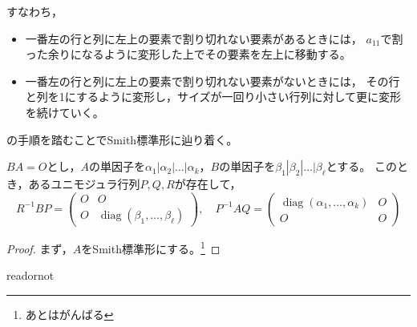 \documentclass[uplatex]{jsarticle}
\DeclareMathOperator{\diag}{diag}
\begin{document}
すなわち，
\begin{itemize}
  \item 一番左の行と列に左上の要素で割り切れない要素があるときには，
  $a_{11}$で割った余りになるように変形した上でその要素を左上に移動する。
  \item 一番左の行と列に左上の要素で割り切れない要素がないときには，
  その行と列を1にするように変形し，サイズが一回り小さい行列に対して更に変形を続けていく。
\end{itemize}
の手順を踏むことでSmith標準形に辿り着く。

\begin{hodai}
  $BA = O$とし，$A$の単因子を$\alpha_{1} | \alpha_{2} | \dots | \alpha_{k}$，$B$の単因子を$\beta_{1} | \beta_{2} | \dots | \beta_{\ell}$とする。
  このとき，あるユニモジュラ行列$P,Q,R$が存在して，
  \begin{equation}
    R^{-1} B P = \begin{pmatrix}
      O & O \\ O & \diag (\beta_{1}, \dots, \beta_{\ell})
    \end{pmatrix}, \quad
    P^{-1} A Q = \begin{pmatrix}
      \diag (\alpha_{1}, \dots, \alpha_{k}) & O \\ O & O
    \end{pmatrix}
  \end{equation}
\end{hodai}

\begin{proof}
  まず，$A$をSmith標準形にする。\footnote{あとはがんばる}
\end{proof}

\expandafter\ifx\csname readornot\endcsname\relax
  
\end{document}
